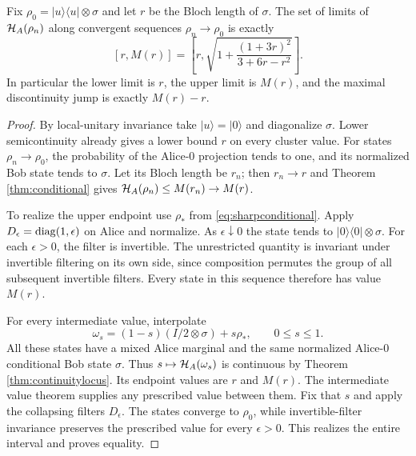\begin{theorem}\label{thm:clusters}
Fix $\rho_0=|u\rangle\langle u|\otimes\sigma$ and let $r$ be the Bloch
length of $\sigma$. The set of limits of $\mathcal H_A(\rho_n)$ along convergent
sequences $\rho_n\to\rho_0$ is exactly
\begin{equation}\label{eq:clusters}\boxed{
 [r,M(r)]=\left[r,\sqrt{1+\frac{(1+3r)^2}{3+6r-r^2}}\right].}
\end{equation}
In particular the lower limit is $r$, the upper limit is $M(r)$,
and the maximal discontinuity jump is exactly $M(r)-r$.
\end{theorem}
\begin{proof}
By local-unitary invariance take $|u\rangle=|0\rangle$ and diagonalize
$\sigma$. Lower semicontinuity already gives a lower bound $r$ on every
cluster value. For states $\rho_n\to\rho_0$, the probability of the
Alice-$0$ projection tends to one, and its normalized Bob state tends
to $\sigma$. Let its Bloch length be $r_n$; then $r_n\to r$ and
Theorem \ref{thm:conditional} gives
$\mathcal H_A(\rho_n)\leq M(r_n)\to M(r)$.

To realize the upper endpoint use $\rho_*$ from
\eqref{eq:sharpconditional}. Apply $D_\epsilon=\operatorname{diag}(1,\epsilon)$ on
Alice and normalize. As $\epsilon\downarrow0$ the state tends to
$|0\rangle\langle0|\otimes\sigma$. For each $\epsilon>0$, the filter
is invertible. The unrestricted quantity is invariant under invertible
filtering on its own side, since composition permutes the group of
all subsequent invertible filters. Every state in this sequence therefore
has value $M(r)$.

For every intermediate value, interpolate
\[
 \omega_s=(1-s)(I/2\otimes\sigma)+s\rho_*,\qquad0\leq s\leq1.
\]
All these states have a mixed Alice marginal and the same normalized
Alice-$0$ conditional Bob state $\sigma$. Thus
$s\mapsto\mathcal H_A(\omega_s)$ is continuous by
Theorem \ref{thm:continuitylocus}. Its endpoint values are $r$ and $M(r)$.
The intermediate value theorem supplies any prescribed value between
them. Fix that $s$ and apply the collapsing filters $D_\epsilon$.
The states converge to $\rho_0$, while invertible-filter invariance
preserves the prescribed value for every $\epsilon>0$.
This realizes the entire interval and proves equality.
\end{proof}

